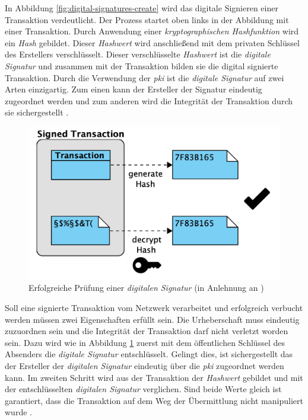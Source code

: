 In Abbildung \ref{fig:digital-signatures-create} wird das digitale Signieren einer Transaktion verdeutlicht. Der Prozess startet oben links in der Abbildung mit einer Transaktion. Durch Anwendung einer \textit{kryptographischen Hashfunktion} wird ein \textit{Hash} gebildet. Dieser \textit{Hashwert} wird anschließend mit dem privaten Schlüssel des Erstellers verschlüsselt. Dieser verschlüsselte \textit{Hashwert} ist die \textit{digitale Signatur} und zusammen mit der Transaktion bilden sie die digital signierte Transaktion. Durch die Verwendung der \textit{\ac{pki}} ist die \textit{digitale Signatur} auf zwei Arten einzigartig. Zum einen kann der Ersteller der Signatur eindeutig zugeordnet werden und zum anderen wird die Integrität der Transaktion durch sie sichergestellt \citep{Drescher2017}.

\begin{figure}[H]
	\centering
	\includegraphics[width=0.7\linewidth]{pictures/digital-signatures-validate-positive}
	\caption[Prüfen einer \textit{digitalen Signatur}]{Erfolgreiche Prüfung einer \textit{digitalen Signatur} (in Anlehnung an \citet{Drescher2017})}
	\label{fig:digital-signatures-validate-positive}
\end{figure}

Soll eine signierte Transaktion vom Netzwerk verarbeitet und erfolgreich verbucht werden müssen zwei Eigenschaften erfüllt sein. Die Urheberschaft muss eindeutig zuzuordnen sein und die Integrität der Transaktion darf nicht verletzt worden sein. Dazu wird wie in Abbildung \ref{fig:digital-signatures-validate-positive} zuerst mit dem öffentlichen Schlüssel des Absenders die \textit{digitale Signatur} entschlüsselt. Gelingt dies, ist sichergestellt das der Ersteller der \textit{digitalen Signatur} eindeutig über die \textit{\ac{pki}} zugeordnet werden kann. Im zweiten Schritt wird aus der Transaktion der \textit{Hashwert} gebildet und mit der entschlüsselten \textit{digitalen Signatur} verglichen. Sind beide Werte gleich ist garantiert, dass die Transaktion auf dem Weg der Übermittlung nicht manipuliert wurde \citep{Drescher2017}.

